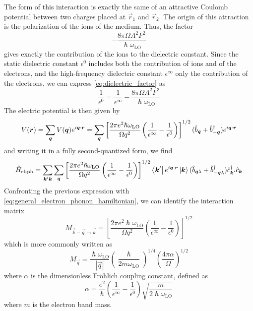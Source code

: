 The form of this interaction is exactly the same of an attractive Coulomb potential between two charges placed at $\vec{r}_1$ and $\vec{r}_2$. The origin of this attraction is the polarization of the ions of the medium. Thus, the factor
\begin{equation} \label{eq:dielectric_factor}
    - \frac{8\pi \Omega A^2 F^2}{\hslash \omega_\text{LO}}
\end{equation}
gives exactly the contribution of the ions to the dielectric constant. Since the static dielectric constant $\epsilon^0$ includes both the contribution of ions and of the electrons, and the high-frequency dielectric constant $\epsilon^\infty$ only the contribution of the electrons, we can express \cref{eq:dielectric_factor} as
\begin{equation}
    \frac{1}{\epsilon^0} = \frac{1}{\epsilon^\infty} - \frac{8\pi \Omega A^2 F^2}{\hslash \omega_\text{LO}}
\end{equation}
The electric potential is then given by
\begin{equation}
    V(\mathbf{\boldsymbol{r}}) = \sum_{\mathbf{\boldsymbol{q}}} V(\mathbf{\boldsymbol{q}}) e^{i\mathbf{\boldsymbol{q}} \cdot \mathbf{\boldsymbol{r}}}
    =  \sum_{\mathbf{\boldsymbol{q}}} \left[ \frac{2\pi e^2 \hslash \omega_\text{LO}}{\Omega q^2} \left( \frac{1}{\epsilon^\infty} - \frac{1}{\epsilon^0} \right) \right]^{1/2} (\hat{b}_{\mathbf{\boldsymbol{q}}} + \hat{b}^\dagger_{-\mathbf{\boldsymbol{q}}}) e^{i\mathbf{\boldsymbol{q}}\cdot\mathbf{\boldsymbol{r}}}
\end{equation}
and writing it in a fully second-quantized form, we find
\begin{equation}
    \hat{H}_\text{el-ph} =  \sum_{\mathbf{\boldsymbol{k}}'\mathbf{\boldsymbol{k}}} \sum_{\mathbf{\boldsymbol{q}}} \left[ \frac{2\pi e^2 \hslash \omega_\text{LO}}{\Omega q^2} \left( \frac{1}{\epsilon^\infty} - \frac{1}{\epsilon^0} \right) \right]^{1/2} \bra{\mathbf{\boldsymbol{k}}'}e^{i\mathbf{\boldsymbol{q}}\cdot\mathbf{\boldsymbol{r}}}\ket{\mathbf{\boldsymbol{k}}}(\hat{b}_{\mathbf{\boldsymbol{q}}\lambda} + \hat{b}^\dagger_{-\mathbf{\boldsymbol{q}}\lambda}) \hat{c}^\dagger_{\mathbf{\boldsymbol{k}}'}\hat{c}_{\mathbf{\boldsymbol{k}}}
\end{equation}
Confronting the previous expression with \cref{eq:general_electron_phonon_hamiltonian}, we can identify the interaction matrix
\begin{equation}
    M_{\vec{k}-\vec{q} \rightarrow \vec{k}} =  \left[ \frac{2\pi e^2 \hslash \omega_\text{LO}}{\Omega q^2} \left( \frac{1}{\epsilon^\infty} - \frac{1}{\epsilon^0} \right) \right]^{1/2}
\end{equation}
which is more commonly written as
\begin{equation} \label{eq:frohlich_matrix}
    M_\vec{q} =  \frac{\hslash \omega_\text{LO}}{|\vec{q}|} \left(\frac{\hslash}{2m\omega_\text{LO}}\right)^{1/4} \left(\frac{4\pi\alpha}{\Omega}\right)^{1/2}
\end{equation}
where $\alpha$ is the dimensionless Fröhlich coupling constant,  defined as
\begin{equation}
    \alpha = \frac{e^2}{\hslash} \left( \frac{1}{\epsilon^\infty} - \frac{1}{\epsilon^0} \right) \sqrt{\frac{m}{2\hslash\omega_\text{LO}}}
\end{equation}
where $m$ is the electron band mass.

